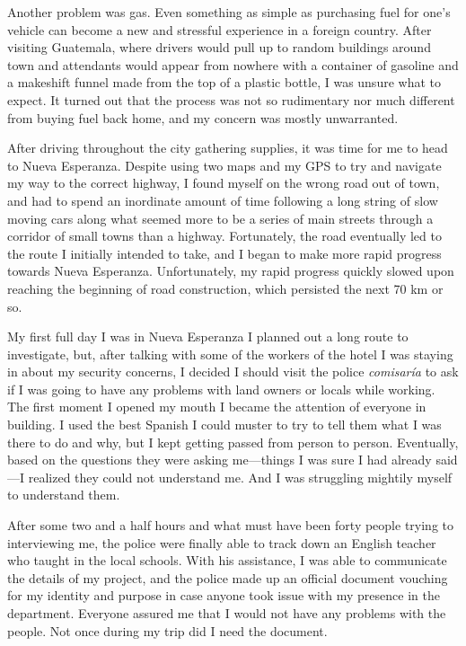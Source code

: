 Another problem was gas. Even something as simple as purchasing fuel for one’s vehicle can become a new and stressful experience in a foreign country. After visiting Guatemala, where drivers would pull up to random buildings around town and attendants would appear from nowhere with a container of gasoline and a makeshift funnel made from the top of a plastic bottle, I was unsure what to expect. It turned out that the process was not so rudimentary nor much different from buying fuel back home, and my concern was mostly unwarranted.

After driving throughout the city gathering supplies, it was time for me to head to Nueva Esperanza. Despite using two maps and my GPS to try and navigate my way to the correct highway, I found myself on the wrong road out of town, and had to spend an inordinate amount of time following a long string of slow moving cars along what seemed more to be a series of main streets through a corridor of small towns than a highway. Fortunately, the road eventually led to the route I initially intended to take, and I began to make more rapid progress towards Nueva Esperanza.
Unfortunately, my rapid progress quickly slowed upon reaching the beginning of road construction, which persisted the next 70 km or so.

My first full day I was in Nueva Esperanza I planned out a long route to investigate, but, after talking with some of the workers of the hotel I was staying in about my security concerns, I decided I should visit the police \textit{comisaría} to ask if I was going to have any problems with land owners or locals while working. The first moment I opened my mouth I became the attention of everyone in building. I used the best Spanish I could muster to try to tell them what I was there to do and why, but I kept getting passed from person to person. Eventually, based on the questions they were asking me—things I was sure I had already said—I realized they could not understand me. And I was struggling mightily myself to understand them.

After some two and a half hours and what must have been forty people trying to interviewing me, the police were finally able to track down an English teacher who taught in the local schools. With his assistance, I was able to communicate the details of my project, and the police made up an official document vouching for my identity and purpose in case anyone took issue with my presence in the department. Everyone assured me that I would not have any problems with the people. Not once during my trip did I need the document.

